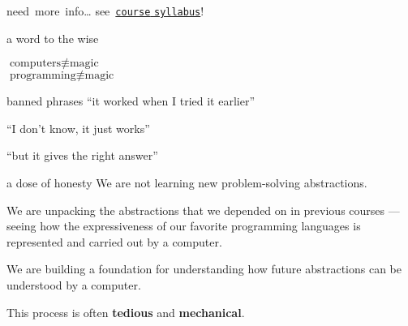 \documentclass[10pt,t,usenames,dvipsnames]{beamer}
\begin{document}
  \begin{frame}[standout]{\mbox{need more info\dots}}
    see~\href{https://csbsju.instructure.com/courses/16318/assignments/syllabus}{\nolinkurl{course} \nolinkurl{syllabus}}!
  \end{frame}

  \begin{frame}{a word to the wise}
    \begin{center}
      \Large
      $\mbox{computers}\not\equiv\mbox{magic}$\\
      $\mbox{programming}\not\equiv\mbox{magic}$\\[1\baselineskip]
    \end{center}

    \pause

    \begin{alertblock}{banned phrases}
      \vspace{.5ex}
      ``it worked when I tried it earlier''

      ``I don't know, it just works''

      ``but it gives the right answer''
    \end{alertblock}

  \end{frame}

  \begin{frame}{a dose of honesty}
    We are not learning new problem-solving abstractions.

    \pause

    We are unpacking the abstractions that we depended on in previous courses
    --- seeing how the expressiveness of our favorite programming languages is
    represented and carried out by a computer.

    We are building a foundation for understanding how future abstractions can
    be understood by a computer.

    \pause

    This process is often \textbf{\color{orange}tedious} and
    \textbf{\color{orange}mechanical}.

  \end{frame}
\end{document}
